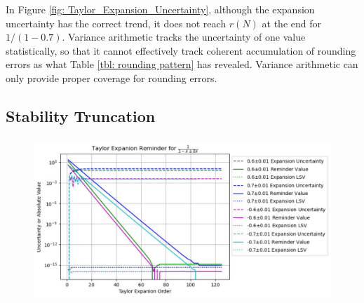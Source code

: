 \documentclass[twoside]{article}
\numberwithin{equation}{section}
\begin{document}
In Figure \ref{fig: Taylor_Expansion_Uncertainty}, although the expansion uncertainty has the correct trend, it does not reach $r(N)$ at the end for $1/(1 -0.7)$.
Variance arithmetic tracks the uncertainty of one value statistically, so that it cannot effectively track coherent accumulation of rounding errors as what Table \ref{tbl: rounding pattern} has revealed. 
Variance arithmetic can only provide proper coverage for rounding errors.


\subsection{Stability Truncation}

\begin{figure}[p]
\centering
\includegraphics[height=2.4in]{Taylor_Expansion_0.01.pdf} 
\label{fig: Taylor_Expansion_0.01}
\end{figure}
\end{document}
